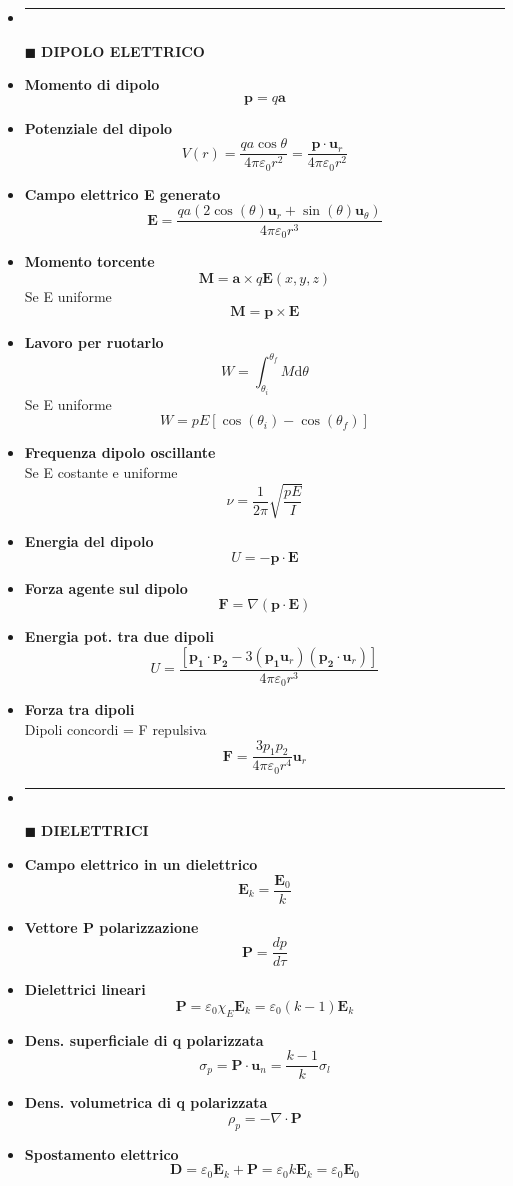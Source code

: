 \documentclass{book}
\newcommand{\g}{\textbf}
\newcommand{\h}{\mathbf}
\newcommand{\e}{\begin{equation}}
\newcommand{\ex}{\end{equation} }
\renewcommand{\it}{\item[$\cdot$]}
\newcommand{\sep}{\item[]\rule{\linewidth}{0.4pt}}
\begin{document}
\begin{multicols}{4}
\begin{itemize}
\sep
\item [$\blacksquare$] \g{DIPOLO ELETTRICO}
    \it \g{Momento di dipolo}
        \e{\h{p}=q \h{a}} \ex
    \it \g{Potenziale del dipolo}
        \e{V(r)=\frac{qa\cos{\theta}}{4\pi\varepsilon_0 r^2}=\frac{\h{p}\cdot\h{u}_r}{4\pi\varepsilon_0 r^2}} \ex
    \it \g{Campo elettrico \g{E} generato}
        \e{\mathbf{E}={\frac{q a\left(2\cos\left(\theta\right)\mathbf{u}_{r}+\sin\left(\theta\right)\mathbf{u}_{\theta}\right)}{4\pi\varepsilon_0 r^{3}}}} \ex
    \it \g{Momento torcente}
        \e{\h{M}=\h{a}\times q\h{E}(x,y,z)} \ex
        Se E uniforme
        \e{\h{M}=\h{p}\times\h{E}} \ex
    \it \g{Lavoro per ruotarlo} 
        \e{W=\int_{\theta_{i}}^{\theta_{f}}M \mathrm{d}\theta} \ex
        Se E uniforme
        \e{W=p E[\cos(\theta_{i})-\cos(\theta_{f})]} \ex
    \it \g{Frequenza dipolo oscillante} \\
        Se E costante e uniforme
        \e{\nu=\frac{1}{2\pi}\sqrt{\frac{pE}{I}}} \ex
    \it \g{Energia del dipolo}
        \e{U=-\h{p}\cdot\h{E}} \ex
    \it \g{Forza agente sul dipolo}
        \e{\h{F}=\nabla(\h{p}\cdot\h{E})} \ex
    \it \g{Energia pot. tra due dipoli}
        \e{U=\frac{[\h{p_1}\cdot\h{p_2}-3(\h{p_1}\h{u}_r)(\h{p_2}\cdot\h{u}_r)]}{4\pi\varepsilon_0r^3}}\ex
    \it \g{Forza tra dipoli}\\
        Dipoli concordi = F repulsiva
        \e{\h{F}=\frac{3p_1p_2}{4\pi\varepsilon_0r^4}\h{u}_r}\ex

\sep
\item [$\blacksquare$] \g{DIELETTRICI}
    \it \g{Campo elettrico in un dielettrico}
        \e{\h{E}_k=\frac{\h{E}_0}{k}} \ex
    \it \g{Vettore P polarizzazione}
        \e{\h{P}=\frac{dp}{d\tau}} \ex
    \it \g{Dielettrici lineari}
        \e{\h{P}=\varepsilon_0\chi_E \h{E}_k=\varepsilon_0(k-1)\h{E}_k} \ex
    \it \g{Dens. superficiale di q polarizzata}
        \e{\sigma_p=\h{P}\cdot\h{u}_n=\frac{k-1}{k}\sigma_l} \ex
    \it \g{Dens. volumetrica di q polarizzata}
        \e{\rho_p=-\nabla\cdot\h{P}} \ex
    \it \g{Spostamento elettrico}
        \e{\h{D}=\varepsilon_0 \h{E}_k+\h{P}=\varepsilon_0 k \h{E}_k=\varepsilon_0 \h{E}_0} \ex


\end{itemize}
\end{multicols}
\end{document}
